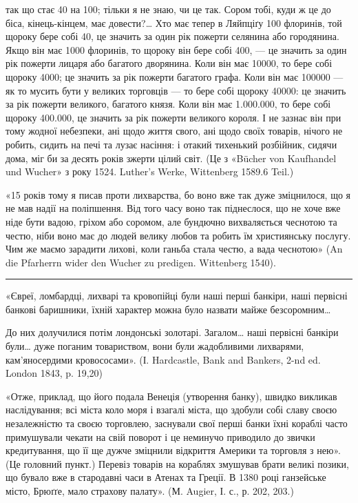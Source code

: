 \parcont{}  %
так що стає 40 на 100; тільки я не знаю, чи це так. Сором тобі, куди ж це
до біса, кінець-кінцем, має довести?\dots{} Хто має тепер в Ляйпціґу 100 флоринів,
той щороку бере собі 40, це значить за один рік пожерти селянина або городянина.
Якщо він має 1000 флоринів, то щороку він бере собі 400, — це значить
за один рік пожерти лицаря або багатого дворянина. Коли він має 10000, то
бере собі щороку 4000; це значить за рік пожерти багатого графа. Коли він
має 100000 — як то мусить бути у великих торговців — то бере собі щороку
40000: це значить за рік пожерти великого, багатого князя. Коли він має
1.000.000, то бере собі щороку 400.000, це значить за рік пожерти великого
короля. І не зазнає він при тому жодної небезпеки, ані щодо життя свого, ані
щодо своїх товарів, нічого не робить, сидить на печі та лузає насіння: і отакий
тихенький розбійник, сидячи дома, міг би за десять років зжерти цілий світ.
(Це з «Bücher von Kaufhandel und Wucher» з року 1524. Luther’s Werke, Wittenberg
1589.6 Teil.)

«15 років тому я писав проти лихварства, бо воно вже так дуже зміцнилося,
що я не мав надії на поліпшення. Від того часу воно так піднеслося, що
не хоче вже ніде бути вадою, гріхом або соромом, але бундючно вихваляється
чеснотою та честю, ніби воно має до людей велику любов та робить їм християнську
послугу. Чим же маємо зарадити лихові, коли ганьба стала честю, а
вада чеснотою» (An die Pfarherrn wider den Wucher zu predigen. Wittenberg 1540).

\pfbreak

«Євреї, ломбардці, лихварі та кровопійці були наші перші банкіри, наші
первісні банкові баришники, їхній характер можна було назвати майже безсоромним\dots{}

До них долучилися потім лондонські золотарі. Загалом\dots{} наші первісні
банкіри були\dots{} дуже поганим товариством, вони були жадобливими лихварями,
кам’яносердими кровососами». (І. Hardcastle, Bank and Bankers, 2-nd ed. London
1843, p. 19,20)

«Отже, приклад, що його подала Венеція (утворення банку), швидко викликав
наслідування; всі міста коло моря і взагалі міста, що здобули собі
славу своєю незалежністю та своєю торговлею, заснували свої перші банки
їхні кораблі часто примушували чекати на свій поворот і це неминучо приводило
до звички кредитування, що її ще дужче зміцнили відкриття Америки та
торговля з нею». (Це головний пункт.) Перевіз товарів на кораблях змушував
брати великі позики, що бувало вже в стародавні часи в Атенах та Греції.
В 1380 році ганзейське місто, Брюґґе, мало страхову палату». (М. Augier, І. с., р.
202, 203.)

